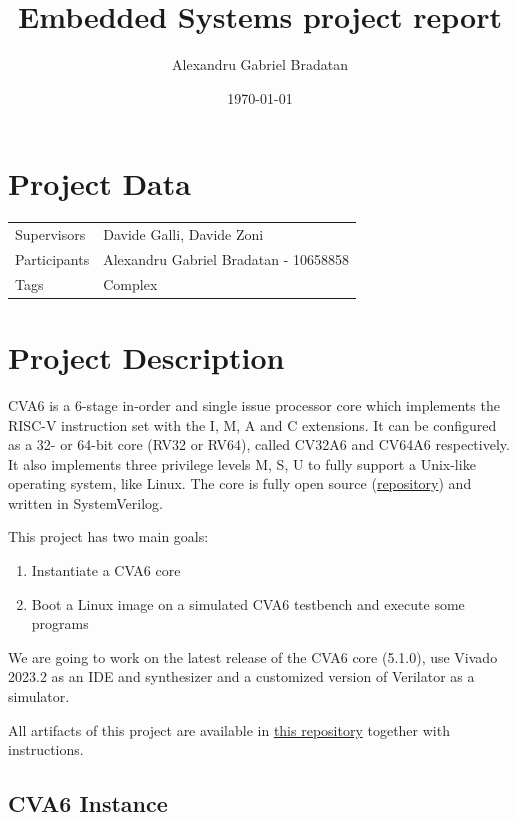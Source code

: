 \documentclass[a4paper,11pt]{article}
\title{Embedded Systems project report}
\author{Alexandru Gabriel Bradatan}
\date{\today}
\begin{document}
\maketitle
\tableofcontents

\section{Project Data}

\begin{table}[H]
  \centering
  \begin{tabular}{ll}
    \toprule
    Supervisors   & Davide Galli, Davide Zoni \\
    Participants  & Alexandru Gabriel Bradatan - 10658858 \\
    Tags          & Complex \\
    \bottomrule
  \end{tabular}
\end{table}

\section{Project Description}

CVA6 is a 6-stage in-order and single issue processor core which implements the
RISC-V instruction set with the I, M, A and C extensions. It can be configured
as a 32- or 64-bit core (RV32 or RV64), called CV32A6 and CV64A6 respectively.
It also implements three privilege levels M, S, U to fully support a Unix-like
operating system, like Linux. The core is fully open source
(\href{https://github.com/openhwgroup/cva6}{repository}) and written in SystemVerilog.

This project has two main goals:

\begin{enumerate}
  \item Instantiate a CVA6 core
  \item Boot a Linux image on a simulated CVA6 testbench and execute some programs
\end{enumerate}

We are going to work on the latest release of the CVA6 core (5.1.0), use
Vivado 2023.2 as an IDE and synthesizer and a customized version of Verilator
as a simulator.

All artifacts of this project are available in \href{https://github.com/alexbradd/embedded-systems-project-2024}{this repository}
together with instructions.

\subsection{CVA6 Instance}
\end{document}
